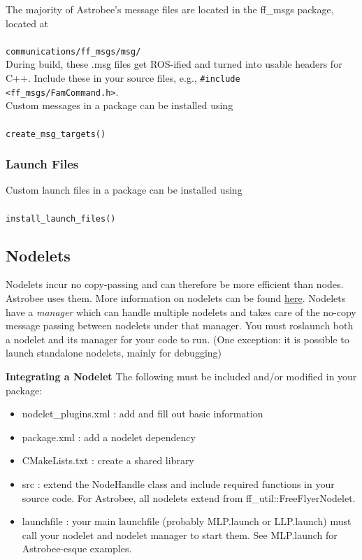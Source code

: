 \documentclass{article}
\begin{document}
The majority of Astrobee's message files are located in the ff\_msgs package, located at\\\\
\texttt{communications/ff\_msgs/msg/}\\

During build, these .msg files get ROS-ified and turned into usable headers for C++. Include these in your source files, e.g., \texttt{\#include <ff\_msgs/FamCommand.h>}. \\

Custom messages in a package can be installed using\\\\
\texttt{create\_msg\_targets()}

\subsubsection{Launch Files}

Custom launch files in a package can be installed using\\\\
\texttt{install\_launch\_files()}

\subsection{Nodelets}

Nodelets incur no copy-passing and can therefore be more efficient than nodes. Astrobee uses them. More information on nodelets can be found \href{http://wiki.ros.org/nodelet}{here}. Nodelets have a \textit{manager} which can handle multiple nodelets and takes care of the no-copy message passing between nodelets under that manager. You must roslaunch both a nodelet and its manager for your code to run. (One exception: it is possible to launch standalone nodelets, mainly for debugging)

\textbf{Integrating a Nodelet}
The following must be included and/or modified in your package:
\begin{itemize}
	\item nodelet\_plugins.xml : add and fill out basic information
	\item package.xml : add a nodelet dependency
	\item CMakeLists.txt : create a shared library
	\item src : extend the NodeHandle class and include required functions in your source code. For Astrobee, all nodelets extend from ff\_util::FreeFlyerNodelet.
	\item launchfile : your main launchfile (probably MLP.launch or LLP.launch) must call your nodelet and nodelet manager to start them. See MLP.launch for Astrobee-esque examples.
\end{itemize}
\end{document}
